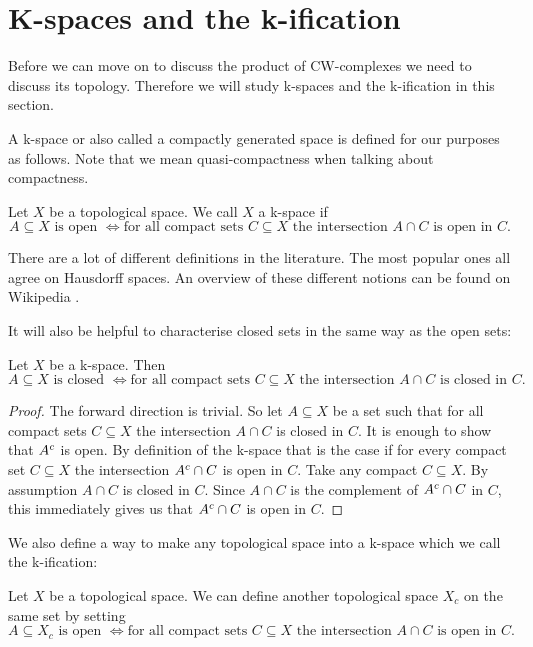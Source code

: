 \section{K-spaces and the k-ification}

Before we can move on to discuss the product of CW-complexes we need to discuss its topology.
Therefore we will study k-spaces and the k-ification in this section.

A k-space or also called a compactly generated space is defined for our purposes as follows. 
Note that we mean quasi-compactness when talking about compactness.

\begin{defi}
    Let $X$ be a topological space. 
    We call $X$ a k-space if 
    \[A \subseteq X \text{ is open } \iff \text{for all compact sets } C \subseteq X \text{ the intersection } A \cap C \text{ is open in } C.\]
\end{defi}

There are a lot of different definitions in the literature. 
The most popular ones all agree on Hausdorff spaces. 
An overview of these different notions can be found on Wikipedia \cite{Wikipedia2024}.

It will also be helpful to characterise closed sets in the same way as the open sets: 

\begin{lem}
    Let $X$ be a k-space. 
    Then 
    \[A \subseteq X \text{ is closed } \iff \text{for all compact sets } C \subseteq X \text{ the intersection } A \cap C \text{ is closed in } C.\]
\end{lem}
\begin{proof}
    The forward direction is trivial. 
    So let $A \subseteq X$ be a set such that for all compact sets $C \subseteq X$ the intersection $A \cap C$ is closed in $C$. 
    It is enough to show that $A^{c}$ is open. 
    By definition of the k-space that is the case if for every compact set $C \subseteq X$ the intersection $A^{c} \cap C$ is open in $C$. 
    Take any compact $C \subseteq X$.
    By assumption $A \cap C$ is closed in $C$.
    Since $A \cap C$ is the complement of $A^{c} \cap C$ in $C$, this immediately gives us that $A^{c} \cap C$ is open in $C$.
\end{proof}

We also define a way to make any topological space into a k-space which we call the k-ification: 

\begin{defi}
    Let $X$ be a topological space. 
    We can define another topological space $X_c$ on the same set by setting
    \[A \subseteq X_c \text{ is open } \iff \text{for all compact sets } C \subseteq X \text{ the intersection } A \cap C \text{ is open in } C.\]
\end{defi}

